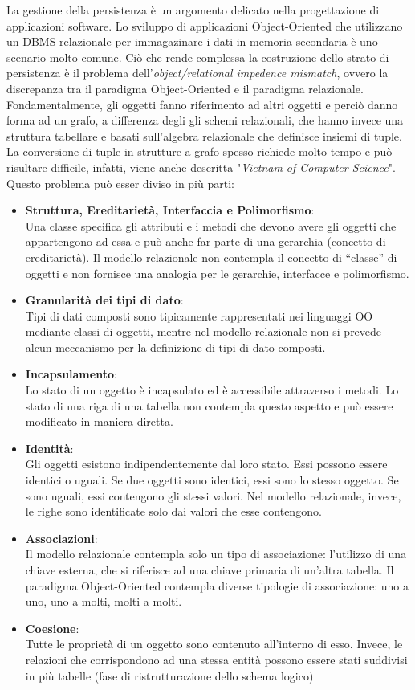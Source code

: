 La gestione della persistenza \`e un argomento delicato nella progettazione di applicazioni software.
Lo sviluppo di applicazioni Object-Oriented che utilizzano un DBMS relazionale per immagazinare i dati in memoria secondaria \`e uno scenario molto comune. Ci\`o che rende complessa la costruzione dello strato di persistenza \`e il problema dell'\emph{object/relational impedence mismatch}, ovvero la discrepanza tra il paradigma Object-Oriented e il paradigma relazionale.\\
Fondamentalmente, gli oggetti fanno riferimento ad altri oggetti e perci\`o danno forma ad un grafo, a differenza degli gli schemi relazionali, che hanno invece una struttura tabellare e basati sull'algebra relazionale che definisce insiemi di tuple. La conversione di tuple in strutture a grafo spesso richiede molto tempo e pu\`o risultare difficile, infatti, viene anche descritta "\emph{Vietnam of Computer Science}".
Questo problema pu\`o esser diviso in pi\`u parti:
\begin{itemize}
\item \textbf{Struttura, Ereditariet\`a, Interfaccia e Polimorfismo}:\\
Una classe specifica gli attributi e i metodi che devono avere gli oggetti che appartengono ad essa e pu\`o anche far parte di una gerarchia (concetto di ereditariet\`a).
Il modello relazionale non contempla il concetto di “classe” di oggetti e non fornisce una analogia per le gerarchie, interfacce e polimorfismo.  
\item \textbf{Granularit\`a dei tipi di dato}:\\
Tipi di dati composti sono tipicamente  rappresentati nei linguaggi OO mediante classi di oggetti, mentre nel modello relazionale non si prevede alcun meccanismo per la definizione di tipi di dato composti. 
\item \textbf{Incapsulamento}:\\
Lo stato di un oggetto \`e incapsulato ed \`e accessibile attraverso i metodi. Lo stato di una riga di una tabella non contempla questo aspetto e pu\`o essere modificato in maniera diretta.
\item \textbf{Identit\`a}:\\
Gli oggetti esistono indipendentemente dal loro stato. Essi possono essere identici o uguali. Se due oggetti sono identici, essi sono lo stesso oggetto. Se sono uguali, essi contengono gli stessi valori. Nel modello relazionale, invece, le righe sono identificate solo dai valori che esse contengono.
\item \textbf{Associazioni}:\\
Il modello relazionale contempla solo un tipo di associazione: l'utilizzo di una chiave esterna, che si riferisce ad una chiave primaria di un'altra tabella. Il paradigma Object-Oriented contempla diverse tipologie di associazione: uno a uno, uno a molti, molti a molti.
\item \textbf{Coesione}:\\
Tutte le propriet\`a di un oggetto sono contenuto all'interno di esso. Invece, le relazioni che corrispondono ad una stessa entit\`a possono essere stati suddivisi in pi\`u tabelle (fase di ristrutturazione dello schema logico)
\end{itemize}
